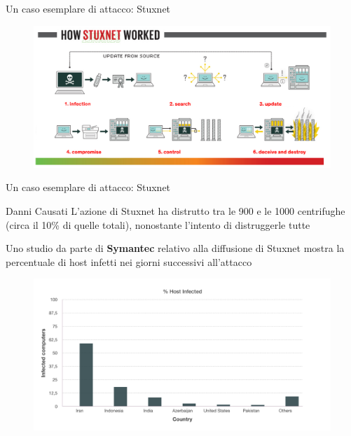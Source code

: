 \begin{frame}{Un caso esemplare di attacco: Stuxnet}
	\begin{figure}[h] 
		\includegraphics[scale=0.3,cfbox=blue_slides 1pt 0pt]{imgs/stuxnet_hsw.png}
	\end{figure}
\end{frame}

\begin{frame}{Un caso esemplare di attacco: Stuxnet}
\begin{block}{Danni Causati}
L'azione di Stuxnet ha distrutto tra le 900 e le 1000 centrifughe (circa il 10\% di quelle totali), nonostante l'intento di distruggerle tutte
\end{block}
Uno studio da parte di \textbf{\color{blue_slides}Symantec} relativo alla diffusione di Stuxnet mostra la percentuale di host infetti nei giorni successivi all'attacco
\begin{figure}[h] 
		\includegraphics[scale=0.23,cfbox=blue_slides 1pt 0pt]{imgs/host_inf.png}
	\end{figure}
\end{frame}


